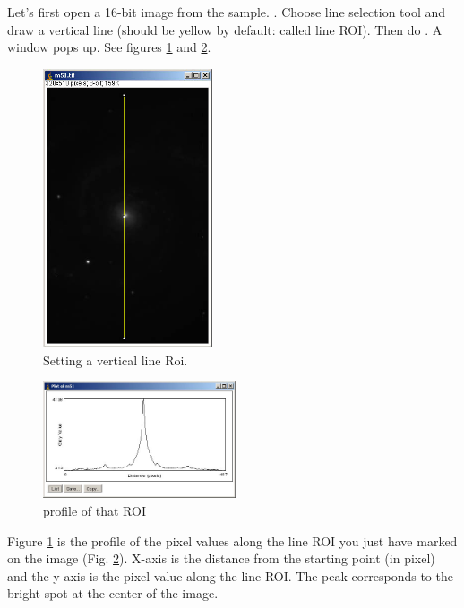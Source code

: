 \begin{indentexercise}{1}
Let's first open a 16-bit image from the sample. 
. Choose line selection tool and draw a vertical line 
(should be yellow by default: called line ROI). Then do . 
A window pops up. See figures \ref{fig:img6} and \ref{fig:img7}.

\begin{figure}[htbp]
\begin{center}
\includegraphics[width=5cm]{img/CMCIBasicCourse201102-img6.jpg}
\caption{Setting a vertical line Roi.}
\label{fig:img6}
\end{center}
\end{figure}

\begin{figure}[htbp]
\begin{center}
\includegraphics[width=5.694cm,height=3.44cm]{img/CMCIBasicCourse201102-img7.jpg}
\caption{profile of that ROI}
\label{fig:img7}
\end{center}
\end{figure}

Figure \ref{fig:img6} is the profile of the pixel values along the line ROI 
you just have marked on the image (Fig. \ref{fig:img7}). X-axis is the distance 
from the starting point (in pixel) and the y axis is the pixel value along the line ROI. 
The peak corresponds to the bright spot at the center of the image. 


\end{indentexercise}
